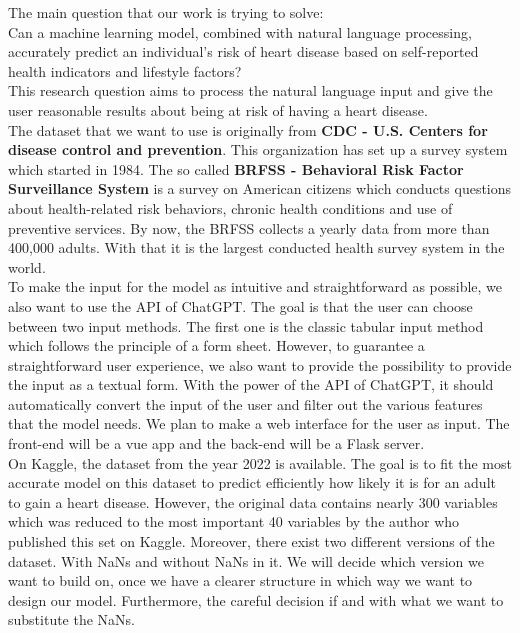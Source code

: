 \documentclass{article}
\begin{document}
The main question that our work is trying to solve:\\
Can a machine learning model, combined with natural language processing, accurately predict an individual’s risk of heart disease based on self-reported health indicators and lifestyle factors?\\
This research question aims to process the natural language input and give the user reasonable results about being at risk of having a heart disease.\\
The dataset that we want to use is originally from \textbf{CDC - U.S. Centers for disease control and prevention}. This organization has set up a survey system which started in 1984. The so called \textbf{BRFSS - Behavioral Risk Factor Surveillance System} is a survey on American citizens which conducts questions about health-related risk behaviors, chronic health conditions and use of preventive services. By now, the BRFSS collects a yearly data from more than 400,000 adults. With that it is the largest conducted health survey system in the world.\\
To make the input for the model as intuitive and straightforward as possible, we also want to use the API of ChatGPT. The goal is that the user can choose between two input methods. The first one is the classic tabular input method which follows the principle of a form sheet. However, to guarantee a straightforward user experience, we also want to provide the possibility to provide the input as a textual form. With the power of the API of ChatGPT, it should automatically convert the input of the user and filter out the various features that the model needs. We plan to make a web interface for the user as input. The front-end will be a vue app and the back-end will be a Flask server.\\
On Kaggle, the dataset from the year 2022 is available. The goal is to fit the most accurate model on this dataset to predict efficiently how likely it is for an adult to gain a heart disease. However, the original data contains nearly 300 variables which was reduced to the most important 40 variables by the author who published this set on Kaggle. Moreover, there exist two different versions of the dataset. With NaNs and without NaNs in it. We will decide which version we want to build on, once we have a clearer structure in which way we want to design our model. Furthermore, the careful decision if and with what we want to substitute the NaNs.\\
\end{document}
